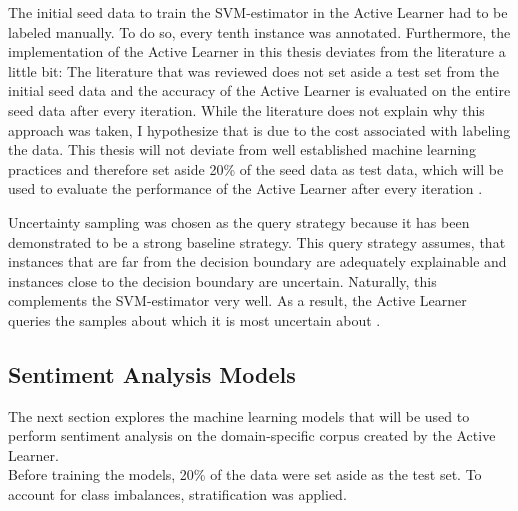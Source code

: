 \documentclass[11pt, a4paper]{article}
\begin{document}
The initial seed data to train the SVM-estimator in the Active Learner had to be labeled manually. To do so, every tenth instance was annotated.
Furthermore, the implementation of the Active Learner in this thesis deviates from the literature a little bit: The literature that was reviewed
does not set aside a test set from the initial seed data and the accuracy of the Active Learner is evaluated on the entire seed data after every iteration. 
While the literature does not explain why this approach was
taken, I hypothesize that is due to the cost associated with labeling the data. This thesis will not deviate from well established machine learning practices
and therefore set aside 20\% of the seed data as test data, which will be used to evaluate the performance of the Active Learner after every iteration \cite[p. 196]{raschka2019pythonmachinelearning}.

Uncertainty sampling was chosen as the query strategy because it has been demonstrated to be a strong baseline strategy. 
This query strategy assumes, that instances that are far from the decision boundary are adequately explainable and instances close to the 
decision boundary are uncertain. Naturally, this complements the SVM-estimator very well. As a result, the Active Learner queries 
the samples about which it is most uncertain about \citep{osbonre2004ensemblebased}.

\subsection{Sentiment Analysis Models} \label{subs:sentimentmodels}
The next section explores the machine learning models that will be used to perform sentiment analysis on the domain-specific corpus created by the Active Learner. \\
Before training the models, 20\% of the data were set aside as the test set. To account for class imbalances, stratification was applied.  
\end{document}
